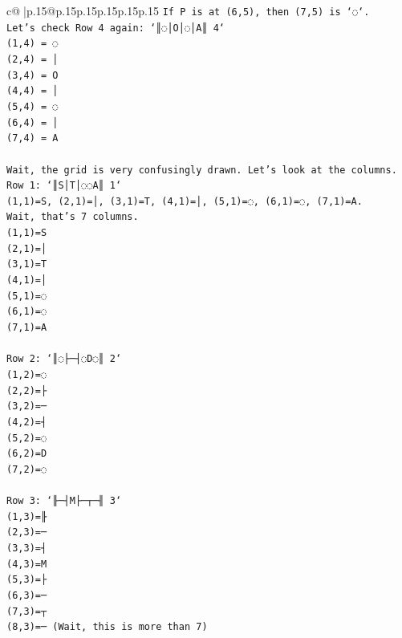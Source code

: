 \documentclass{article}
\begin{document}
{\begin{supertabular}{c@{$\;$}|p{.15\linewidth}@{}p{.15\linewidth}p{.15\linewidth}p{.15\linewidth}p{.15\linewidth}p{.15\linewidth}}
{{{\texttt{If P is at (6,5), then (7,5) is `◌`.} \\
\texttt{Let's check Row 4 again: `║◌│O│◌│A║ 4`} \\
\texttt{(1,4) = ◌} \\
\texttt{(2,4) = │} \\
\texttt{(3,4) = O} \\
\texttt{(4,4) = │} \\
\texttt{(5,4) = ◌} \\
\texttt{(6,4) = │} \\
\texttt{(7,4) = A} \\
\\ 
\texttt{Wait, the grid is very confusingly drawn. Let's look at the columns.} \\
\texttt{Row 1: `║S│T│◌◌A║ 1`} \\
\texttt{(1,1)=S, (2,1)=│, (3,1)=T, (4,1)=│, (5,1)=◌, (6,1)=◌, (7,1)=A.} \\
\texttt{Wait, that's 7 columns.} \\
\texttt{(1,1)=S} \\
\texttt{(2,1)=│} \\
\texttt{(3,1)=T} \\
\texttt{(4,1)=│} \\
\texttt{(5,1)=◌} \\
\texttt{(6,1)=◌} \\
\texttt{(7,1)=A} \\
\\ 
\texttt{Row 2: `║◌├─┤◌D◌║ 2`} \\
\texttt{(1,2)=◌} \\
\texttt{(2,2)=├} \\
\texttt{(3,2)=─} \\
\texttt{(4,2)=┤} \\
\texttt{(5,2)=◌} \\
\texttt{(6,2)=D} \\
\texttt{(7,2)=◌} \\
\\ 
\texttt{Row 3: `╟─┤M├─┬─╢ 3`} \\
\texttt{(1,3)=╟} \\
\texttt{(2,3)=─} \\
\texttt{(3,3)=┤} \\
\texttt{(4,3)=M} \\
\texttt{(5,3)=├} \\
\texttt{(6,3)=─} \\
\texttt{(7,3)=┬} \\
\texttt{(8,3)=─ (Wait, this is more than 7)} \\
}}}
\end{supertabular}}
\end{document}
